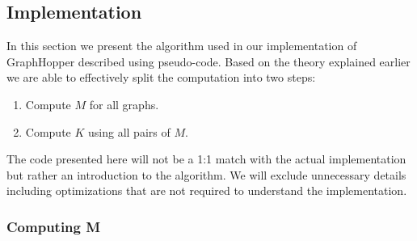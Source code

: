 \documentclass{article}
\begin{document}
\subsection{Implementation}
In this section we present the algorithm used in our implementation of GraphHopper described using pseudo-code. Based on the theory explained earlier we are able to effectively split the computation into two steps:
\begin{enumerate}
	\item Compute $M$ for all graphs.
	\item Compute $K$ using all pairs of $M$.
\end{enumerate}
The code presented here will not be a 1:1 match with the actual implementation but rather an introduction to the algorithm. We will exclude unnecessary details including optimizations that are not required to understand the implementation.

\subsubsection{Computing M}
\end{document}

